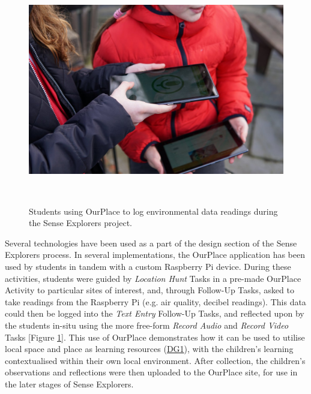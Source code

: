\begin{figure}
  \centering
  \includegraphics[width=0.8\columnwidth]{images/chapter07/senseExplorers.jpg}
  \caption[Students using OurPlace to log findings during Sense Explorers]{Students using OurPlace to log environmental data readings during the Sense Explorers project.}~\label{fig:SenseExplorers}
\end{figure}

Several technologies have been used as a part of the design section of the Sense Explorers process. In several implementations, the OurPlace application has been used by students in tandem with a custom Raspberry Pi device. During these activities, students were guided by \textit{Location Hunt} Tasks in a pre-made OurPlace Activity to particular sites of interest, and, through Follow-Up Tasks, asked to take readings from the Raspberry Pi (e.g. air quality, decibel readings). This data could then be logged into the \textit{Text Entry} Follow-Up Tasks, and reflected upon by the students in-situ using the more free-form \textit{Record Audio} and \textit{Record Video} Tasks [Figure \ref{fig:SenseExplorers}]. This use of OurPlace demonstrates how it can be used to utilise local space and place as learning resources (\hyperref[DG1]{DG1}), with the children's learning contextualised within their own local environment. After collection, the children's observations and reflections were then uploaded to the OurPlace site, for use in the later stages of Sense Explorers.

